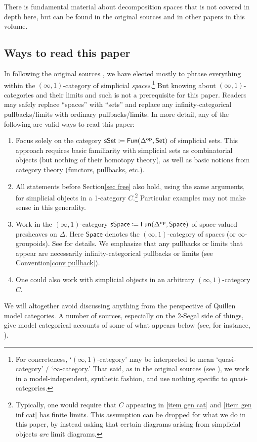 \documentclass{amsart}
\theoremstyle{definition}
\theoremstyle{remark}
\newcommand{\set}{\mathsf{Set}}
\newcommand{\spaces}{\mathsf{Space}}
\newcommand{\sset}{\mathsf{sSet}}
\newcommand{\sspace}{\mathsf{sSpace}}
\newcommand{\fun}{\mathsf{Fun}}
\newcommand{\op}{\textup{op}}
\begin{document}
There is fundamental material about decomposition spaces that is not covered in depth here, but can be found in the original sources and in other papers in this volume.

\subsection{Ways to read this paper}\label{sec ways to read}
In following the original sources \cite{GKT1,GKT2,GKT3}, we have elected mostly to phrase everything within the $(\infty,1)$-category of simplicial \emph{spaces}.\footnote{For concreteness, `$(\infty,1)$-category' may be interpreted to mean `quasi-category' / `$\infty$-category.' 
That said, as in the original sources (see \cite[1.3]{GKT1}), we work in a model-independent, synthetic fashion, and use nothing specific to quasi-categories.}
But knowing about $(\infty,1)$-categories and their limits and such is not a prerequisite for this paper.
Readers may safely replace ``spaces'' with ``sets'' and replace any infinity-categorical pullbacks/limits with ordinary pullbacks/limits.
In more detail, any of the following are valid ways to read this paper:
\begin{enumerate}[left=0pt]
\item Focus solely on the category $\sset \coloneqq \fun(\Delta^\op, \set)$ of simplicial sets. 
This approach requires basic familiarity with simplicial sets as combinatorial objects (but nothing of their homotopy theory), as well as basic notions from category theory (functors, pullbacks, etc.).
\label{item sset}
\item All statements before Section\nobreakspace \ref {sec free} also hold, using the same arguments, for simplicial objects in a 1-category $C$.\footnote{Typically, one would require that $C$ appearing in \eqref{item gen cat} and \eqref{item gen inf cat} has finite limits.
This assumption can be dropped for what we do in this paper, by instead asking that certain diagrams arising from simplicial objects \emph{are} limit diagrams.}
Particular examples may not make sense in this generality.
\label{item gen cat}
\item Work in the $(\infty,1)$-category $\sspace \coloneqq \fun(\Delta^\op, \spaces)$ of space-valued presheaves on $\Delta$.
Here $\spaces$ denotes the $(\infty,1)$-category of spaces (or $\infty$-groupoids).
See \cite{GKT1} for details.
We emphasize that any pullbacks or limits that appear are necessarily infinity-categorical pullbacks or limits (see Convention\nobreakspace \ref {conv pullback}).
\item 
One could also work with simplicial objects in an arbitrary $(\infty,1)$-category $C$.
\label{item gen inf cat}
\end{enumerate}
We will altogether avoid discussing anything from the perspective of Quillen model categories.
A number of sources, especially on the 2-Segal side of things, give model categorical accounts of some of what appears below (see, for instance, \cite{DyckerhoffKapranov:HSS,Feller:Q2SS,BOORS:ESC}).
\end{document}
